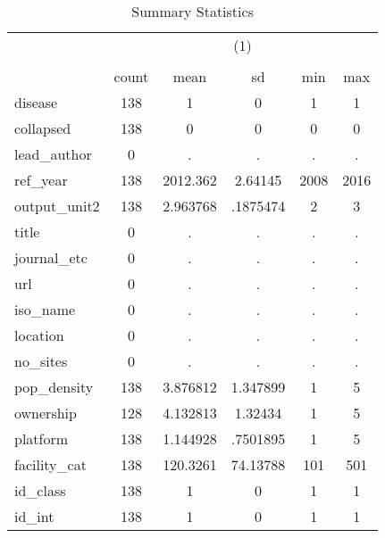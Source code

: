 \begin{table}[htbp]\centering
\def\sym#1{\ifmmode^{#1}\else\(^{#1}\)\fi}
\caption{Summary Statistics}
\begin{tabular}{l*{1}{ccccc}}
\hline\hline
            &\multicolumn{5}{c}{(1)}                                         \\
            &\multicolumn{5}{c}{}                                            \\
            &       count&        mean&          sd&         min&         max\\
\hline
disease     &         138&           1&           0&           1&           1\\
collapsed   &         138&           0&           0&           0&           0\\
lead\_author &           0&           .&           .&           .&           .\\
ref\_year    &         138&    2012.362&     2.64145&        2008&        2016\\
output\_unit2&         138&    2.963768&    .1875474&           2&           3\\
title       &           0&           .&           .&           .&           .\\
journal\_etc &           0&           .&           .&           .&           .\\
url         &           0&           .&           .&           .&           .\\
iso\_name    &           0&           .&           .&           .&           .\\
location    &           0&           .&           .&           .&           .\\
no\_sites    &           0&           .&           .&           .&           .\\
pop\_density &         138&    3.876812&    1.347899&           1&           5\\
ownership   &         128&    4.132813&     1.32434&           1&           5\\
platform    &         138&    1.144928&    .7501895&           1&           5\\
facility\_cat&         138&    120.3261&    74.13788&         101&         501\\
id\_class    &         138&           1&           0&           1&           1\\
id\_int      &         138&           1&           0&           1&           1\\

\end{tabular}
\end{table}
